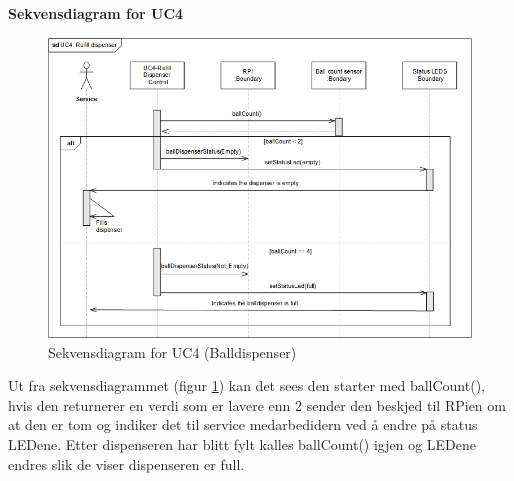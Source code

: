 \documentclass[Rapport/Rapport_main.tex]{subfiles}
\begin{document}
\textbf{Sekvensdiagram for UC4}\\
\begin{figure}[H]
    \centering
    \includegraphics[width=\textwidth]{Arkitektur/Softwarearkitektur/Applikationsmodel/BallDispenser/graphicsBallDispenser/sdUC4.png}
    \caption{Sekvensdiagram for UC4 (Balldispenser)}
    \label{fig:BallDispScUC4}
\end{figure}

Ut fra sekvensdiagrammet (figur \ref{fig:BallDispScUC4}) kan det sees den starter med ballCount(), hvis den returnerer en verdi som er lavere enn 2 sender den beskjed til RPien om at den er tom og indiker det til service medarbedidern ved å endre på status LEDene. Etter dispenseren har blitt fylt kalles ballCount() igjen og LEDene endres slik de viser dispenseren er full.
\end{document}
